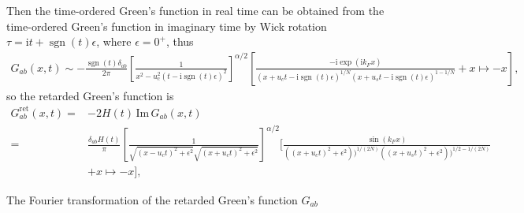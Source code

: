 \documentclass[10pt]{extarticle}
\newcommand{\ii}{\mathrm{i}}
\DeclareMathOperator{\sgn}{sgn}
\begin{document}
Then the time-ordered Green's function in real time can be obtained from the time-ordered Green's function in imaginary time by Wick rotation $\tau=\ii t+\sgn(t)\epsilon$, where $\epsilon=0^+$, thus
\[
\begin{aligned}
	G_{ab}(x,t)\sim -\frac{\sgn(t)\delta_{ab}}{2\pi}\left[\frac{1}{x^2-u_c^2(t-\ii \sgn(t)\epsilon)^2}\right]^{\alpha/2}\left[\frac{-\ii\exp(\ii k_F x)}{(x+u_ct-\ii \sgn(t)\epsilon)^{1/N}(x+u_st-\ii \sgn(t)\epsilon)^{1-1/N}}+x\mapsto -x\right],
\end{aligned}
\]
so the retarded Green's function is
\[
\begin{aligned}
	G^{\text{ret}}_{ab}(x,t)=&-2H(t)\,\mathrm{Im}\, G_{ab}(x,t)\\
	=&\frac{\delta_{ab}H(t)}{\pi}\left[\frac{1}{\sqrt{(x-u_ct)^2+\epsilon^2}\sqrt{(x+u_ct)^2+\epsilon^2}}\right]^{\alpha/2}\biggl[\frac{\sin(k_F x)}{((x+u_ct)^2+\epsilon^2))^{1/(2N)}((x+u_st)^2+\epsilon^2))^{1/2-1/(2N)}}\\
	&+x\mapsto -x\biggr],
\end{aligned}
\]

The Fourier transformation of the retarded Green's function $G_{ab}$ 

\end{document}
